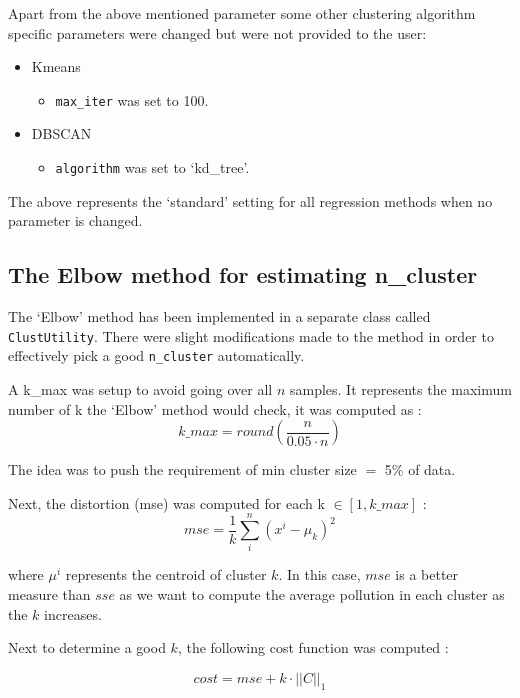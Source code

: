 \documentclass[12pt]{article}
\begin{document}
Apart from the above mentioned parameter some other clustering algorithm specific parameters were changed but were not provided to the user:

\begin{itemize}
\item Kmeans
\begin{itemize}
\item \texttt{max\_iter} was set to 100.
\end{itemize}
\item DBSCAN
\begin{itemize}
\item \texttt{algorithm} was set to `kd\_tree'.
\end{itemize}
\end{itemize}

The above represents the `standard' setting for all regression methods when no parameter is changed. 

\subsection*{The Elbow method for estimating n\_cluster}

The `Elbow' method has been implemented in a separate class called \texttt{ClustUtility}. There were slight modifications made to the method in order to effectively pick a good \texttt{n\_cluster} automatically.

A k\_max was setup to avoid going over all $n$ samples. It represents the maximum number of k the `Elbow' method would check, it was computed as : 
\begin{equation}
k\_max = round(\frac{n}{0.05 \cdot n})
\end{equation}

The idea was to push the requirement of min cluster size $=$ 5\% of data.

Next, the distortion (mse) was computed for each k $\in [1, k\_max]$ :
\begin{equation}
mse = \frac{1}{k} \sum_{i}^{n} \left( x^{i} - \mu_{k} \right)^2
\end{equation}

where $\mu^{i}$ represents the centroid of cluster $k$. In this case, $mse$ is a better measure than $sse$ as we want to compute the average pollution in each cluster as the $k$ increases.

Next to determine a good $k$, the following cost function was computed :

\begin{equation}
cost = mse + k \cdot || C ||_1
\end{equation}
\end{document}
